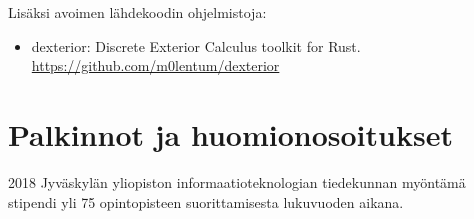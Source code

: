 \documentclass{article}
\begin{document}
Lisäksi avoimen lähdekoodin ohjelmistoja:
\begin{itemize}
  \item dexterior: Discrete Exterior Calculus toolkit for Rust.
    \url{https://github.com/m0lentum/dexterior}
\end{itemize}

\section*{Palkinnot ja huomionosoitukset}

2018 Jyväskylän yliopiston informaatioteknologian tiedekunnan myöntämä stipendi
yli 75 opintopisteen suorittamisesta lukuvuoden aikana.
\end{document}
